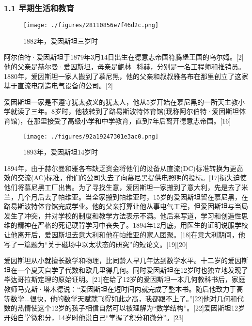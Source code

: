 \subsubsection{1.1 早期生活和教育}
\begin{figure}[ht]
\centering
\texttt{[image: ./figures/28110856e7f46d2c.png]}
\caption{1882年，爱因斯坦三岁时} \label{fig_AYST_1}
\end{figure}
阿尔伯特·爱因斯坦于1879年3月14日出生在德意志帝国符腾堡王国的乌尔姆。[2]他的父亲是赫尔曼·爱因斯坦，母亲是鲍林·科赫，分别是一名工程师和推销员。1880年，爱因斯坦一家人搬到了慕尼黑，他的父亲和叔叔雅各布在那里创立了这家基于直流电制造电气设备的公司。[2]

爱因斯坦一家是不遵守犹太教义的犹太人，他从5岁开始在慕尼黑的一所天主教小学就读了三年。8岁时，他被转到了路易斯波特体育馆(现称阿尔伯特·爱因斯坦体育馆)，在那里接受了高级小学和中学教育，直到7年后离开德意志帝国。[16]
\begin{figure}[ht]
\centering
\texttt{[image: ./figures/92a19247301e3ac0.png]}
\caption{1893年，爱因斯坦14岁时} \label{fig_AYST_2}
\end{figure}
1894年，由于赫尔曼和雅各布缺乏资金将他们的设备从直流(DC)标准转换为更高效的交流(AC)标准，他们的公司失去了向慕尼黑提供电照明的投标。[17]损失迫使他们将慕尼黑工厂出售。为了寻找生意，爱因斯坦一家搬到了意大利，先是去了米兰，几个月后去了帕维亚。当全家搬到帕维亚时，15岁的爱因斯坦留在慕尼黑，在路易斯波特体育馆完成学业。他的父亲打算让他从事电气工程，但爱因斯坦与当局发生了冲突，并对学校的制度和教学方法表示不满。他后来写道，学习和创造性思维的精神在严格的死记硬背学习中丧失了。1894年12月底，用医生的证明说服学校让他离开后，爱因斯坦去意大利和他在帕维亚的家人团聚。[18]在意大利期间，他写了一篇题为“关于磁场中以太状态的研究”的短论文。[19][20]

爱因斯坦从小就擅长数学和物理，比同龄人早几年达到数学水平。十二岁的爱因斯坦在一个夏天自学了代数和欧几里得几何。同时爱因斯坦在12岁时也独立地发现了毕达哥拉斯定理的原始证明。[21]在给了12岁的爱因斯坦一本几何教科书后，家庭教师马克斯·塔木德说：“爱因斯坦在短时间内就完成了整本书。随后他致力于高等数学...很快，他的数学天赋就飞得如此之高，我都跟不上了。”[22]他对几何和代数的热情使这个12岁的孩子相信自然可以被理解为“数学结构”。[22]爱因斯坦12岁开始自学微积分，14岁时他说自己“掌握了积分和微分”。[23]

